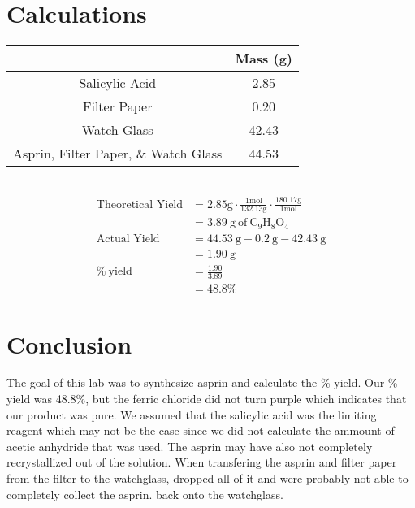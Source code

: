 \documentclass[12pt]{article}
\begin{document}
    \section*{Calculations}
        \begin{table}[h!]
            \centering
            \begin{tabular}{c|c}
                & Mass (g) \\
                \hline
                Salicylic Acid & 2.85 \\
                Filter Paper & 0.20 \\
                Watch Glass & 42.43 \\
                Asprin, Filter Paper, \& Watch Glass & 44.53 
            \end{tabular}
        \end{table}
        \begin{align*}
            \\\\\\
            \text{Theoretical Yield} &= 2.85 \mathrm{g} \cdot \frac{1 \mathrm{mol}}{132.13 \mathrm{g}} \cdot \frac{180.17 \mathrm{g}}{1 \mathrm{mol}}\\
            &= 3.89 \mathrm{~ g ~ of ~ C_9H_8O_4}\\
            \text{Actual Yield} &= 44.53 ~ \mathrm{g} - 0.2 ~ \mathrm{g} - 42.43 ~ \mathrm{g}\\
            &= 1.90~\mathrm{g}\\
            \mathrm{\%~yield} &= \frac{1.90}{3.89}\\
            &= 48.8 \%
        \end{align*}
    \section*{Conclusion}
        The goal of this lab was to synthesize asprin and calculate the \% yield. Our \% yield was 48.8\%, but the ferric chloride did not turn purple which indicates that our product was pure. We assumed that the salicylic acid was the limiting reagent which may not be the case since we did not calculate the ammount of acetic anhydride that was used. The asprin may have also not completely recrystallized out of the solution. When transfering the asprin and filter paper from the filter to the watchglass, dropped all of it and were probably not able to completely collect the asprin. back onto the watchglass.
\end{document}
